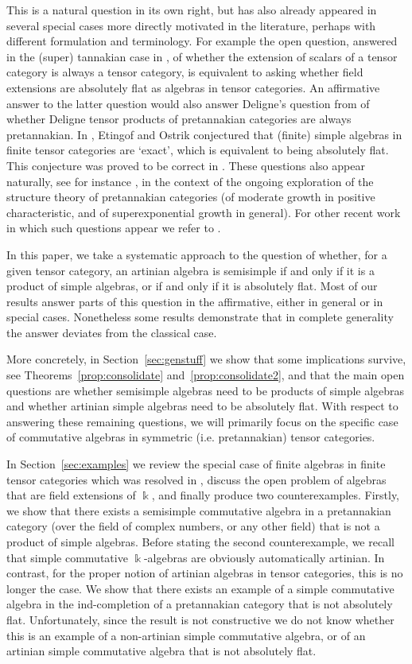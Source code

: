 \documentclass[11pt]{amsart}
\def\bk{\Bbbk}
\theoremstyle{definition}
\theoremstyle{remark}
\numberwithin{equation}{section}
\begin{document}
This is a natural question in its own right, but has also already appeared in several special cases more directly motivated in the literature, perhaps with different formulation and terminology. For example the open question, answered in the (super) tannakian case in \cite{Del14, CEOP}, of whether the extension of scalars of a tensor category is always a tensor category, is equivalent to asking whether field extensions are absolutely flat as algebras in tensor categories. An affirmative answer to the latter question would also answer Deligne's question from \cite{Del90} of whether Deligne tensor products of pretannakian categories are always pretannakian. In \cite{EO}, Etingof and Ostrik conjectured that (finite) simple algebras in finite tensor categories are `exact', which is equivalent to being absolutely flat. This conjecture was proved to be correct in \cite{CSZ}. These questions also appear naturally, see for instance \cite{CEO}, in the context of the ongoing exploration of the structure theory of pretannakian categories (of moderate growth in positive characteristic, and of superexponential growth in general). For other recent work in which such questions appear we refer to \cite{Le, SY}.


In this paper, we take a systematic approach to the question of whether, for a given tensor category, an artinian algebra is semisimple if and only if it is a product of simple algebras, or if and only if it is absolutely flat. Most of our results answer parts of this question in the affirmative, either in general or in special cases. Nonetheless some results demonstrate that in complete generality the answer deviates from the classical case.

More concretely, in Section~\ref{sec:genstuff} we show that some implications survive, see Theorems~\ref{prop:consolidate} and~\ref{prop:consolidate2}, and that the main open questions are whether semisimple algebras need to be products of simple algebras and whether artinian simple algebras need to be absolutely flat. With respect to answering these remaining questions, we will primarily focus on  the specific case of commutative algebras in symmetric (i.e. pretannakian) tensor categories.

In Section~\ref{sec:examples} we review the special case of finite algebras in finite tensor categories which was resolved in \cite{CSZ}, discuss the open problem of algebras that are field extensions of $\bk$, and finally produce two counterexamples. Firstly, we show that there exists a semisimple commutative algebra in a pretannakian category (over the field of complex numbers, or any other field) that is not a product of simple algebras. Before stating the second counterexample, we recall that simple commutative $\bk$-algebras are obviously automatically artinian. In contrast, for the proper notion of artinian algebras in tensor categories, this is no longer the case. We show that there exists an example of a simple commutative algebra in the ind-completion of a pretannakian category that is not absolutely flat. Unfortunately, since the result is not constructive we do not know whether this is an example of a non-artinian simple commutative algebra, or of an artinian simple commutative algebra that is not absolutely flat.
\end{document}
